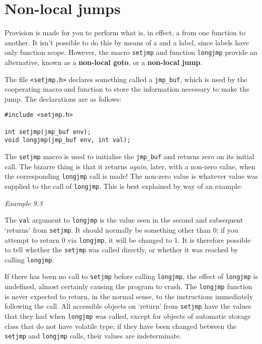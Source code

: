  
        \section{Non-local jumps}
        

  

  Provision is made for you to perform what is, in effect,
   a \goto{} from one function to another.  It isn't possible to do
   this by means of a \goto{} and a label, since labels have only
   function scope.  However, the macro \texttt{setjmp} and function
   \texttt{longjmp} provide an alternative, known as a \textbf{non-local
   goto}, or a \textbf{non-local jump}.


  The file \texttt{<setjmp.h>} declares something called
   a \texttt{jmp\_buf}, which is used by the cooperating macro and function
   to store the information necessary to make the jump.  The declarations are
   as follows:


  \begin{Verbatim}
#include <setjmp.h>

int setjmp(jmp_buf env);
void longjmp(jmp_buf env, int val);
\end{Verbatim}

  The \texttt{setjmp} macro is  used  to  initialise  the
   \texttt{jmp\_buf}  and returns zero on its initial call.  The bizarre
   thing is that it returns \textit{again}, later, with a  non-zero  value,
   when  the corresponding  \texttt{longjmp}  call is made!  The non-zero
   value is whatever value was supplied to the call of \texttt{longjmp}.
   This is best explained by way of an example:


  \begin{center}\textit{Example 9.3}\end{center}


  The \texttt{val} argument to \texttt{longjmp} is the value seen in
   the  second and subsequent `returns' from \texttt{setjmp}.  It
   should normally be something other than 0; if  you  attempt  to  return
   0  via \texttt{longjmp},  it will be changed to 1.  It is therefore
   possible to tell whether the \texttt{setjmp} was called directly,  or
   whether it was reached by calling \texttt{longjmp}.


  If there has been no call to \texttt{setjmp} before calling
   \texttt{longjmp}, the effect of \texttt{longjmp} is undefined,
   almost certainly causing the  program  to  crash.   The
   \texttt{longjmp}  function  is  never expected to return, in the normal
   sense, to the instructions immediately following the call.  All accessible
   objects  on `return'  from  \texttt{setjmp}  have  the  values
   that they had when \texttt{longjmp} was called, except for objects of
   automatic  storage class  that  do  not  have  volatile type; if they have
   been changed between the \texttt{setjmp} and \texttt{longjmp} calls,
   their  values are indeterminate.


